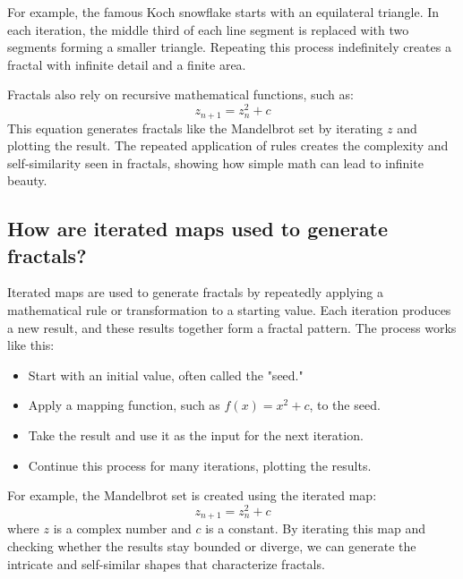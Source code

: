 \documentclass[12pt]{article}
\begin{document}
For example, the famous Koch snowflake starts with an equilateral triangle. In each iteration, the middle third of each line segment is replaced with two segments forming a smaller triangle. Repeating this process indefinitely creates a fractal with infinite detail and a finite area.

Fractals also rely on recursive mathematical functions, such as:
\[
z_{n+1} = z_n^2 + c
\]
This equation generates fractals like the Mandelbrot set by iterating \( z \) and plotting the result. The repeated application of rules creates the complexity and self-similarity seen in fractals, showing how simple math can lead to infinite beauty.

\subsection{How are iterated maps used to generate fractals?}
Iterated maps are used to generate fractals by repeatedly applying a mathematical rule or transformation to a starting value. Each iteration produces a new result, and these results together form a fractal pattern. The process works like this:
\begin{itemize}
    \item Start with an initial value, often called the "seed."
    \item Apply a mapping function, such as \( f(x) = x^2 + c \), to the seed.
    \item Take the result and use it as the input for the next iteration.
    \item Continue this process for many iterations, plotting the results.
\end{itemize}

For example, the Mandelbrot set is created using the iterated map:
\[
z_{n+1} = z_n^2 + c
\]
where \( z \) is a complex number and \( c \) is a constant. By iterating this map and checking whether the results stay bounded or diverge, we can generate the intricate and self-similar shapes that characterize fractals.
\end{document}
